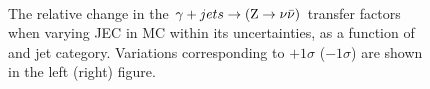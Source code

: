 \begin{figure}[!h]
  \centering
   ~~
  \\

  \caption{\label{fig:tfSyst_jec_gjToZinv} The relative change in the
  $\gamma + jets \rightarrow ({\text Z} \rightarrow \nu\bar{\nu})$ transfer
  factors when varying JEC in MC within its uncertainties, as a function of \scalht and jet category. 
  Variations corresponding to $+1\sigma$ ($-1\sigma$) are shown in the left (right) figure. 
  }
\end{figure}

